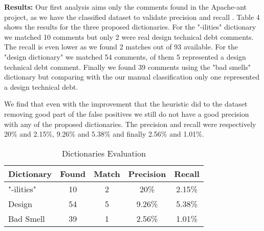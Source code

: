 
\noindent \textbf{Results:} Our first analysis aims only the comments found in the Apache-ant project, as we have the classified dataset to validate precision and recall . Table 4  shows the results for the three proposed dictionaries. For the "-ilities" dictionary we matched 10 comments but only 2 were real design technical debt comments. The recall is even lower as we found 2 matches out of 93 available. For the "design dictionary" we matched 54 comments, of them 5 represented a design technical debt comment. Finally we found 39 comments using the "bad smells" dictionary but comparing with the our manual classification only one represented a design technical debt.

We find that even with the improvement that the heuristic did to the dataset removing good part of the false positives we still do not have a good precision with any of the proposed dictionaries. The precision and recall were respectively 20\% and 2.15\%, 9.26\% and 5.38\% and finally 2.56\% and 1.01\%.




\begin{table}[!hbt]
    \begin{center}
        \caption{Dictionaries Evaluation}
        \label{tab:dictionaryEvaluation}
        \begin{tabular}{l| c c c c} 
            \toprule
            \textbf{Dictionary} & \textbf{Found} &  \textbf{Match}  &  \textbf{Precision} & \textbf{Recall} \\ 
            \midrule
            "-ilities" & 10 & 2 & 20\% & 2.15\% \\ 
            Design & 54 & 5 & 9.26\% & 5.38\% \\
            Bad Smell  & 39 & 1 & 2.56\% & 1.01\% \\ 
            \bottomrule
        \end{tabular}
    \end{center}
\end{table}

